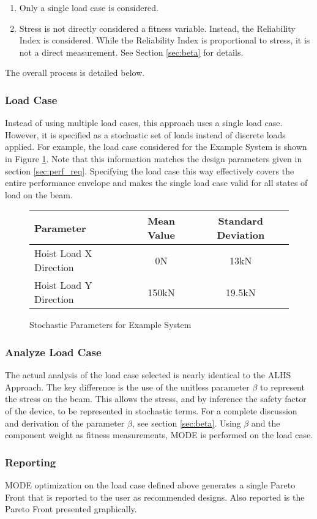 \begin{enumerate}
\item Only a single load case is considered. 
\item Stress is not directly considered a fitness variable. Instead, the Reliability Index is considered. While the Reliability Index is proportional to stress, it is not a direct measurement. See Section \ref{sec:beta} for details. 
\end{enumerate}
The overall process is detailed below. 

\subsubsection{Load Case}
Instead of using multiple load cases, this approach uses a single load case. However, it is specified as a stochastic set of loads instead of discrete loads applied. For example, the load case considered for the Example System is shown in Figure \ref{fig:stoch_params}. Note that this information matches the design parameters given in section \ref{sec:perf_req}. Specifying the load case this way effectively covers the entire performance envelope and makes the single load case valid for all states of load on the beam. 

\begin{figure}[!h]
    \begin{center}
    \begin{tabular}{|l|cc|}
	    \hline
	    Parameter & Mean Value & Standard Deviation\\
	    \hline
	    Hoist Load X Direction & 0N & 13kN\\
	    Hoist Load Y Direction & 150kN & 19.5kN\\
	    \hline
    \end{tabular}
    \caption{Stochastic Parameters for Example System}
    \label{fig:stoch_params}
    \end{center}
\end{figure}

\subsubsection{Analyze Load Case}
The actual analysis of the load case selected is nearly identical to the ALHS Approach. The key difference is the use of the unitless parameter $\beta$ to represent the stress on the beam. This allows the stress, and by inference the safety factor of the device, to be represented in stochastic terms. For a complete discussion and derivation of the parameter $\beta$, see section \ref{sec:beta}. Using $\beta$ and the component weight as fitness measurements, MODE is performed on the load case.

\subsubsection{Reporting}
MODE optimization on the load case defined above generates a single Pareto Front that is reported to the user as recommended designs. Also reported is the Pareto Front presented graphically. 
